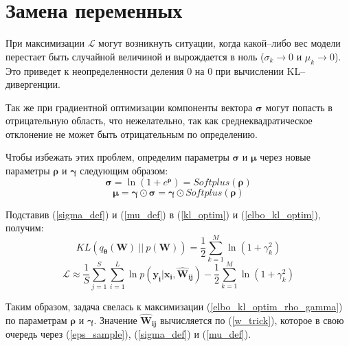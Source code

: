 \documentclass{article}
\numberwithin{equation}{section}
\begin{document}
    \section{Замена переменных}

    При максимизации $\mathcal{L}$ могут возникнуть ситуации,
    когда какой--либо вес модели перестает быть случайной величиной и вырождается в ноль
    ($\sigma_{k} \rightarrow 0$ и $\mu_{k} \rightarrow 0$).
    Это приведет к неопределенности деления 0 на 0 при вычислении KL--дивергенции.

    Так же при градиентной оптимизации компоненты вектора $\pmb{\sigma}$
    могут попасть в отрицательную область, что нежелательно,
    так как среднеквадратическое отклонение не может быть отрицательным по определению.

    Чтобы избежать этих проблем,
    определим параметры $\pmb{\sigma}$ и $\pmb{\mu}$
    через новые параметры $\pmb{\rho}$ и $\pmb{\gamma}$
    следующим образом:
    \begin{equation}\label{sigma_def}
        \pmb{\sigma}
        =
            \ln({
                1 + e^{\pmb{\rho}}
            })
        =
            Softplus (\pmb{\rho})
    \end{equation}
    \begin{equation}\label{mu_def}
        \pmb{\mu} = \pmb{\gamma} \odot \pmb{\sigma} = \pmb{\gamma} \odot Softplus (\pmb{\rho})
    \end{equation}

    Подставив (\ref{sigma_def}) и (\ref{mu_def}) в (\ref{kl_optim}) и (\ref{elbo_kl_optim}), получим:
    \begin{equation}\label{kl_optim_rho_gamma}
        KL(q_{\pmb{\theta}}(\pmb{W})~||~p(\pmb{W}))
        =
            \frac{1}{2} \sum_{k=1}^{M} \ln(
                {1 + \gamma_{k}^{2}}
            )
    \end{equation}
    \begin{equation}\label{elbo_kl_optim_rho_gamma}
        \mathcal{L}
        \approx
            \frac{1}{S} \sum_{j=1}^S \sum_{i=1}^{L} {
                \ln{
                    p(\pmb{y_{i}} | \pmb{x_{i}}, \pmb{\hat{W}_{ij}})
                }
            }
        -
            \frac{1}{2} \sum_{k=1}^{M} \ln(
                {1 + \gamma_{k}^{2}}
            )
    \end{equation}

    Таким образом, задача свелась к максимизации (\ref{elbo_kl_optim_rho_gamma})
    по параметрам $\pmb{\rho}$ и $\pmb{\gamma}$.
    Значение $\pmb{\hat{W}_{ij}}$ вычисляется по (\ref{w_trick}),
    которое в свою очередь через
    (\ref{eps_sample}), (\ref{sigma_def}) и (\ref{mu_def}).
\end{document}

